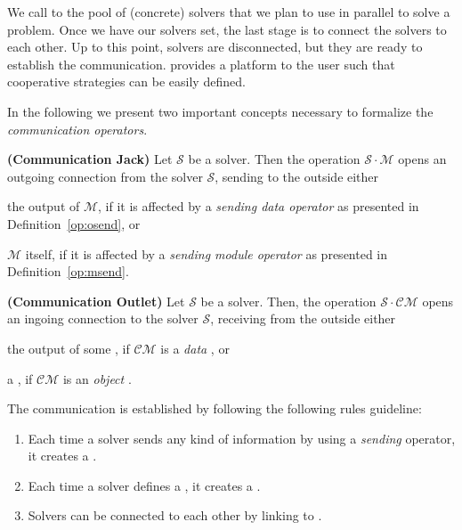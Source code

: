 We call \soset{} to the pool of (concrete) solvers that we plan to use in parallel to solve a problem. Once we have our solvers set, the last stage is to connect the solvers to each other. Up to this point, solvers are disconnected, but they are ready to establish the communication. \posl{} provides a platform  to the user such that cooperative strategies can be easily defined.

In the following we present two important concepts necessary to formalize the {\it communication operators}.

\begin{definition}\label{def:comm_jack}
{\bf (Communication Jack)} Let $\mathcal{S}$ be a solver. Then the operation $\mathcal{S}\cdot\mathcal{M}$ opens an outgoing connection from the solver $\mathcal{S}$, sending to the outside either 
\begin{inparaenum}[a)]
	\item the output of $\mathcal{M}$, if it is affected by a {\it sending data operator} as presented in Definition~\ref{op:osend}, or
	\item $\mathcal{M}$ itself, if it is affected by a {\it sending module operator} as presented in Definition~\ref{op:msend}.
\end{inparaenum}
\end{definition} 

\begin{definition}\label{def:comm_outlet}
{\bf (Communication Outlet)} Let $\mathcal{S}$ be a solver. Then, the operation $\mathcal{S}\cdot\mathcal{CM}$ opens an ingoing connection to the solver $\mathcal{S}$, receiving from the outside either 
\begin{inparaenum}[a)]
	\item the output of some \om{}, if $\mathcal{CM}$ is a {\it data} \opch{}, or
	\item a \om{}, if $\mathcal{CM}$ is an {\it object} \opch.
\end{inparaenum}
\end{definition} 


The communication is established by following the following rules guideline:
\begin{enumerate}%
	\item Each time a solver sends any kind of information by using a {\it sending} operator, it creates a \INTROjack.
	\item Each time a solver defines a \opch, it creates a \INTROoutlet. 
	\item Solvers can be connected to each other by linking \jacks{} to \outlets.
\end{enumerate} %

